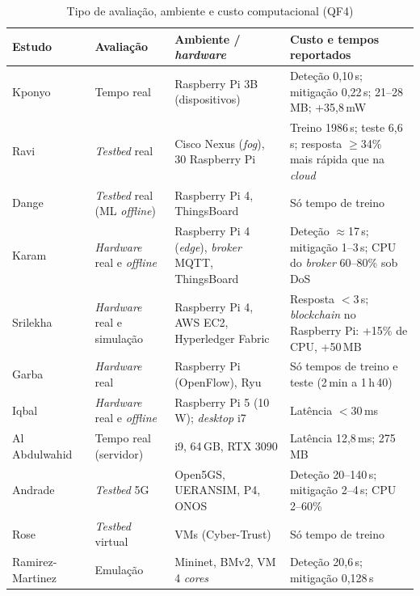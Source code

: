 \documentclass[conference,a4paper]{IEEEtran}
\begin{document}
\begin{table}[p]
\vspace{3mm}
\caption{Tipo de avaliação, ambiente e custo computacional (QF4)}\label{tab:qf4}
\centering\scriptsize
\setlength{\tabcolsep}{3pt}
\renewcommand{\arraystretch}{0.84}
\begin{tabular}{@{}>{\raggedright\arraybackslash}p{}>{\raggedright\arraybackslash}p{}>{\raggedright\arraybackslash}p{}>{\raggedright\arraybackslash}p{}@{}}
\toprule
Estudo & Avaliação & Ambiente / \textit{hardware} & Custo e tempos reportados \\
\midrule
Kponyo~\cite{kponyo2020lightweight} & Tempo real & 4 Raspberry Pi 3B (dispositivos) & Deteção 0,10\,s; mitigação 0,22\,s; 21--28\,MB; +35,8\,mW \\
Ravi~\cite{ravi2020semisupervised} & \textit{Testbed} real & Cisco Nexus (\textit{fog}), 30 Raspberry Pi & Treino 1986\,s; teste 6,6\,s; resposta $\ge$34\% mais rápida que na \textit{cloud} \\
Dange~\cite{dange2025dual} & \textit{Testbed} real (ML \textit{offline}) & Raspberry Pi 4, ThingsBoard & Só tempo de treino \\
Karam~\cite{karam2025isaaf} & \textit{Hardware} real e \textit{offline} & Raspberry Pi 4 (\textit{edge}), \textit{broker} MQTT, ThingsBoard & Deteção $\approx$17\,s; mitigação 1--3\,s; CPU do \textit{broker} 60--80\% sob DoS \\
Srilekha~\cite{srilekha2025hybrid} & \textit{Hardware} real e simulação & Raspberry Pi 4, AWS EC2, Hyperledger Fabric & Resposta $<$3\,s; \textit{blockchain} no Raspberry Pi: +15\% de CPU, +50\,MB \\
Garba~\cite{garba2024sdn} & \textit{Hardware} real & Raspberry Pi (OpenFlow), Ryu & Só tempos de treino e teste (2\,min a 1\,h\,40) \\
Iqbal~\cite{Iqbal2026} & \textit{Hardware} real e \textit{offline} & Raspberry Pi 5 (10\,W); \textit{desktop} i7 & Latência $<$30\,ms \\
Al Abdulwahid~\cite{Abdulwahid2025} & Tempo real (servidor) & i9, 64\,GB, RTX 3090 & Latência 12,8\,ms; 275\,MB \\
Andrade~\cite{andrade2024ddos} & \textit{Testbed} 5G & Open5GS, UERANSIM, P4, ONOS & Deteção 20--140\,s; mitigação 2--4\,s; CPU 2--60\% \\
Rose~\cite{rose2022ideres} & \textit{Testbed} virtual & VMs (Cyber-Trust) & Só tempo de treino \\
Ramirez-Martinez~\cite{ramirezmartinez2025p4} & Emulação & Mininet, BMv2, VM 4 \textit{cores} & Deteção 20,6\,s; mitigação 0,128\,s \\

\end{tabular}
\end{table}
\end{document}
